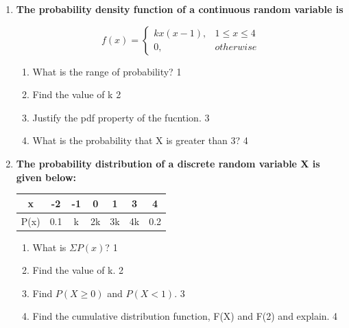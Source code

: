 \documentclass[a4paper,oneside, margin=1.4in]{book}
\begin{document}
\begin{enumerate}
$$
  f(x) =
\begin{cases}
k(x+1),  & 0 \le x \le 1 \\
0, & otherwise
\end{cases}
$$

  \begin{enumerate}
    \item
	What is a random variable? \hfill 1
    \item
    	Find the value of k \hfill 2
    \item
    	Find the probability that the values of x would lie between 0 and 0.5. \hfill 3
     \item
     	What is the probability that X is greater than 0.8?  \hfill 4
  \end{enumerate}
  
    \item
  \textbf{The probability density function of a continuous random variable is}

$$
  f(x) =
\begin{cases}
kx(x-1),  & 1 \le x \le 4 \\
0, & otherwise
\end{cases}
$$

  \begin{enumerate}
    \item
	What is the range of probability? \hfill 1
    \item
    	Find the value of k \hfill 2
    \item
    	Justify the pdf property of the fucntion. \hfill 3
     \item
     	What is the probability that X is greater than 3?  \hfill 4
  \end{enumerate}


 \item
	  \textbf{The probability distribution of a discrete random variable X is given below:} 

	  \begin{table}[h]
	  \begin{center}
\begin{tabular}{c|cccccc}
x    & -2   & -1 & 0   & 1 & 3 & 4   \\ \hline
P(x) & 0.1 & k & 2k & 3k & 4k & 0.2
\end{tabular} 
\end{center}	
\end{table}
  
  \begin{enumerate}
    \item
	What is $\Sigma P(x)$? \hfill 1
    \item
	Find the value of k. \hfill 2
    \item  
	Find $P(X \geq 0)$ and $P(X < 1)$. \hfill 3
    \item
	Find the cumulative distribution function, F(X) and F(2) and explain. \hfill 4
  \end{enumerate}


\end{enumerate}
\end{document}
